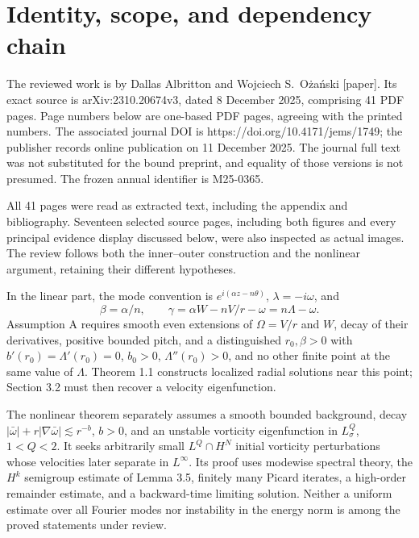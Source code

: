 \documentclass[10pt]{article}
\begin{document}
\section*{Identity, scope, and dependency chain}
The reviewed work is by Dallas Albritton and Wojciech S. Ożański [paper]. Its exact source is arXiv:2310.20674v3, dated 8 December 2025, comprising 41 PDF pages. Page numbers below are one-based PDF pages, agreeing with the printed numbers. The associated journal DOI is https://doi.org/10.4171/jems/1749; the publisher records online publication on 11 December 2025. The journal full text was not substituted for the bound preprint, and equality of those versions is not presumed. The frozen annual identifier is M25-0365.\par
All 41 pages were read as extracted text, including the appendix and bibliography. Seventeen selected source pages, including both figures and every principal evidence display discussed below, were also inspected as actual images. The review follows both the inner–outer construction and the nonlinear argument, retaining their different hypotheses.\par
In the linear part, the mode convention is \(e^{i(\alpha z-n\theta)}\), \(\lambda=-i\omega\), and \[\beta=\alpha/n,\qquad \gamma=\alpha W-nV/r-\omega=n\Lambda-\omega.\] Assumption A requires smooth even extensions of \(\Omega=V/r\) and \(W\), decay of their derivatives, positive bounded pitch, and a distinguished \(r_0,\beta>0\) with \(b'(r_0)=\Lambda'(r_0)=0\), \(b_0>0\), \(\Lambda''(r_0)>0\), and no other finite point at the same value of \(\Lambda\). Theorem 1.1 constructs localized radial solutions near this point; Section 3.2 must then recover a velocity eigenfunction.\par
The nonlinear theorem separately assumes a smooth bounded background, decay \(|\bar\omega|+r|\nabla\bar\omega|\lesssim r^{-b}\), \(b>0\), and an unstable vorticity eigenfunction in \(L^Q_\sigma\), \(1<Q<2\). It seeks arbitrarily small \(L^Q\cap H^N\) initial vorticity perturbations whose velocities later separate in \(L^\infty\). Its proof uses modewise spectral theory, the \(H^k\) semigroup estimate of Lemma 3.5, finitely many Picard iterates, a high-order remainder estimate, and a backward-time limiting solution. Neither a uniform estimate over all Fourier modes nor instability in the energy norm is among the proved statements under review.\par
\end{document}
